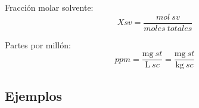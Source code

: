 \documentclass[../Teoría.root.tex]{subfiles}
\begin{document}
Fracción molar solvente:
\begin{equation} \label{eq:concentracion.frac solvente}
    Xsv = \frac{mol\ sv}{moles\ totales}
\end{equation}

Partes por millón:
\begin{equation} \label{eq:concentracion.ppm}
    ppm = \frac{\si{\mg}\ st}{\si{\L}\ sc} = \frac{\si{\mg}\ st}{\si{\kg}\ sc}
\end{equation}

\subsection{Ejemplos}
\end{document}
